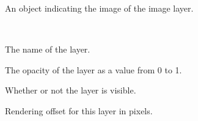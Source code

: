 \documentclass[letterpaper,10pt,english]{sphinxmanual}
\begin{document}
\begin{fulllineitems}
\begin{fulllineitems}
\end{fulllineitems}


\begin{fulllineitems}
\label{index:tmx.ImageLayer.image}
An {\hyperref[index:tmx.Image]{\emph{}}} object indicating the image of the image layer.

\end{fulllineitems}


\end{fulllineitems}


\begin{fulllineitems}
\label{index:tmx.Layer}~

\begin{fulllineitems}
\label{index:tmx.Layer.name}
The name of the layer.

\end{fulllineitems}


\begin{fulllineitems}
\label{index:tmx.Layer.opacity}
The opacity of the layer as a value from 0 to 1.

\end{fulllineitems}


\begin{fulllineitems}
\label{index:tmx.Layer.visible}
Whether or not the layer is visible.

\end{fulllineitems}


\begin{fulllineitems}
\label{index:tmx.Layer.offsetx}
Rendering offset for this layer in pixels.

\end{fulllineitems}


\end{fulllineitems}
\end{document}
